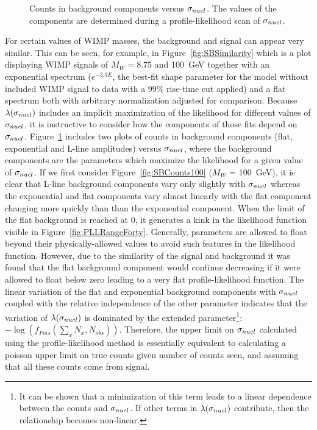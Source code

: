 			\begin{figure}
				\centering
				\caption[Counts in background components versus $\signuc$]
				{Counts in background components versus $\signuc$.  The values of the 
				components are determined during a profile-likelihood scan of $\signuc$.}
				\label{fig:SBCountsInComponents}
			\end{figure}	
		
For certain values of WIMP masses, the background and 	signal can appear very similar.  This can be seen, for example, in Figure~\ref{fig:SBSimilarity} which is a plot displaying WIMP signals of $M_{W}=8.75$ and 100~GeV together with an exponential spectrum ($e^{-3.3 E}$, the best-fit shape parameter for the model without included WIMP signal to data with a 99\% rise-time cut applied) and a flat spectrum both with arbitrary normalization adjusted for comparison.  Because $\lambda(\sigma_{nucl})$ includes an implicit maximization of the likelihood for different values of $\signuc$, it is instructive to consider how the components of those fits depend on $\signuc$.  Figure~\ref{fig:SBCountsInComponents} includes two plots of counts in background components (flat, exponential and L-line amplitudes) versus $\signuc$, where the background components are the parameters which maximize the likelihood for a given value of $\signuc$.  %
If we first consider Figure~\ref{fig:SBCounts100} ($M_{W}$ = 100~GeV), it is clear that L-line background components vary only slightly with $\signuc$ whereas the exponential and flat components vary almost linearly with the flat component changing more quickly than than the exponential component.  When the limit of the flat background is reached at 0, it generates a kink in the likelihood function visible in Figure~\ref{fig:PLLRangeForty}.  Generally, parameters are allowed to float beyond their physically-allowed values to avoid such features in the likelihood function.  However, due to the similarity of the signal and background it was found that the flat background component would continue decreasing if it were allowed to float below zero leading to a very flat profile-likelihood function.  The linear variation of the flat and exponential background components with $\signuc$ coupled with the relative independence of the other parameter indicates that the variation of $\lambda(\sigma_{nucl})$ is dominated by the extended parameter\footnote{It can be shown that a minimization of this term leads to a linear dependence between the counts and $\signuc$.  If other terms in $\lambda(\sigma_{nucl})$ contribute, then the relationship becomes non-linear.}: $-\log \left( f_{Pois} \left( \sum_{x} N_{x}, N_{obs} \right) \right)$.  Therefore, the upper limit on $\signuc$ calculated using the profile-likelihood method is essentially equivalent to calculating a poisson upper limit on true counts given number of counts seen, and assuming that all these counts come from signal.  %

